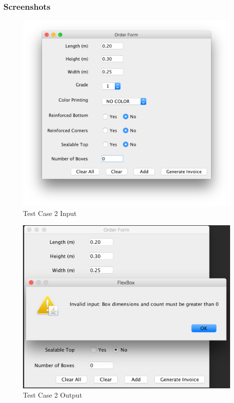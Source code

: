 \documentclass[12pt]{article}
\begin{document}
\subsubsection{Screenshots}
\begin{figure}[H]
	\includegraphics[width=\linewidth]{./screenshots/test_case_2_input.png}
	\caption{Test Case 2 Input}
	\label{test_case_2_input}
\end{figure}
\begin{figure}[H]
	\includegraphics[width=\linewidth]{./screenshots/test_case_2_output.png}
	\caption{Test Case 2 Output}
	\label{test_case_2_output}
\end{figure}
\newpage
\end{document}
